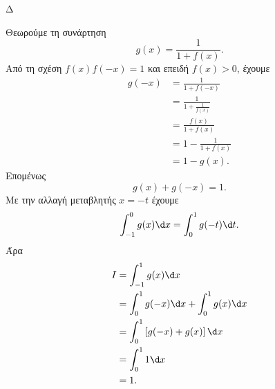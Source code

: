 \begin{thema}{Δ}
\begin{erwthma}
Θεωρούμε τη συνάρτηση
\[
g(x)=\frac{1}{1+f(x)}.
\]
Από τη σχέση $f(x)f(-x)=1$ και επειδή $f(x)>0$, έχουμε
\begin{align*}
g(-x)
&=\frac{1}{1+f(-x)}\\
&=\frac{1}{1+\frac{1}{f(x)}}\\
&=\frac{f(x)}{1+f(x)}\\
&=1-\frac{1}{1+f(x)}\\
&=1-g(x).
\end{align*}
Επομένως
\[
g(x)+g(-x)=1.
\]
Με την αλλαγή μεταβλητής $x=-t$ έχουμε
\[
\int_{-1}^{0}g(x)\d x=\int_0^1g(-t)\d t.
\]
Άρα
\begin{align*}
I
&=\int_{-1}^{1}g(x)\d x\\
&=\int_0^1g(-x)\d x+\int_0^1g(x)\d x\\
&=\int_0^1\left[g(-x)+g(x)\right]\d x\\
&=\int_0^1 1\d x\\
&={1}.
\end{align*}
\end{erwthma}
\end{thema}

